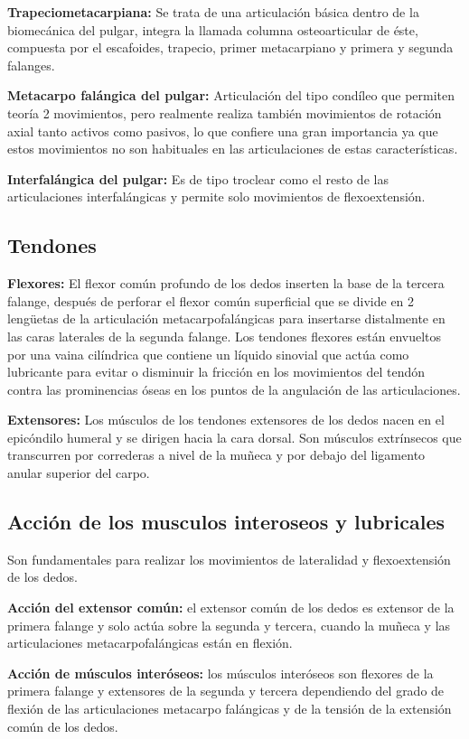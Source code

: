 \documentclass{article}
\begin{document}
\textbf{Trapeciometacarpiana:} Se trata de una articulación básica dentro de la biomecánica del pulgar, integra la llamada columna osteoarticular de éste, compuesta por el escafoides, trapecio, primer metacarpiano y primera y segunda falanges.

\textbf{Metacarpo falángica del pulgar:} Articulación del tipo condíleo que permiten teoría 2 movimientos, pero realmente realiza también movimientos de rotación axial tanto activos como pasivos, lo que confiere una gran importancia ya que estos movimientos no son habituales en las articulaciones de estas características.

\textbf{Interfalángica del pulgar:} Es de tipo troclear como el resto de las articulaciones interfalángicas y permite solo movimientos de flexoextensión.

\subsection{Tendones}
\textbf{Flexores:} El flexor común profundo de los dedos inserten la base de la tercera falange, después de perforar el flexor común superficial que se divide en 2 lengüetas de la articulación metacarpofalángicas para insertarse distalmente en las caras laterales de la segunda falange. Los tendones flexores están envueltos por una vaina cilíndrica que contiene un líquido sinovial que actúa como lubricante para evitar o disminuir la fricción en los movimientos del tendón contra las prominencias óseas en los puntos de la angulación de las articulaciones.

\textbf{Extensores:} Los músculos de los tendones extensores de los dedos nacen en el epicóndilo humeral y se dirigen hacia la cara dorsal. Son músculos extrínsecos que transcurren por correderas a nivel de la muñeca y por debajo del ligamento anular superior del carpo. 

\subsection{Acción de los musculos interoseos y lubricales}
Son fundamentales para realizar los movimientos de lateralidad y flexoextensión de los dedos.

\textbf{Acción del extensor común:} el extensor común de los dedos es extensor de la primera falange y solo actúa sobre la segunda y tercera, cuando la muñeca y las articulaciones metacarpofalángicas están en flexión.

\textbf{Acción de músculos interóseos:} los músculos interóseos son flexores de la primera falange y extensores de la segunda y tercera dependiendo del grado de flexión de las articulaciones metacarpo falángicas y de la tensión de la extensión común de los dedos.
\end{document}
